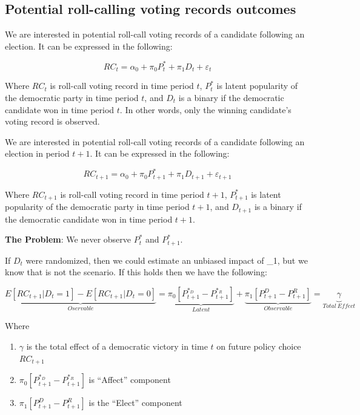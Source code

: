 \documentclass[
]{book}
\providecommand{\tightlist}{%
  \setlength{\itemsep}{0pt}\setlength{\parskip}{0pt}}
\begin{document}
\subsection{Potential roll-calling voting records outcomes}\label{potential-roll-calling-voting-records-outcomes}

We are interested in potential roll-call voting records of a candidate following an election. It can be expressed in the following:

\[ RC_t=\alpha_0 + \pi_0 P^\ast_t + \pi_1 D_t + \varepsilon_t \]

Where \(RC_t\) is roll-call voting record in time period \(t\), \(P^\ast_t\) is latent popularity of the democratic party in time period \(t\), and \(D_t\) is a binary if the democratic candidate won in time period \(t\). In other words, only the winning candidate's voting record is observed.

We are interested in potential roll-call voting records of a candidate following an election in period \(t+1\). It can be expressed in the following:

\[ RC_{t+1}=\alpha_0 + \pi_0 P^\ast_{t+1}+ \pi_1 D_{t+1} + \varepsilon_{t+1} \]

Where \(RC_{t+1}\) is roll-call voting record in time period \(t+1\), \(P^\ast_{t+1}\) is latent popularity of the democratic party in time period \(t+1\), and \(D_{t+1}\) is a binary if the democratic candidate won in time period \(t+1\).

\textbf{The Problem}: We never observe \(P^\ast_{t}\) and \(P^\ast_{t+1}\).

If \(D_t\) were randomized, then we could estimate an unbiased impact of \pi\_1, but we know that is not the scenario. If this holds then we have the following:

\[  \underbrace{E[RC_{t+1}|D_t=1]-E[RC_{t+1}|D_t=0]}_{Oservable} = \underbrace{\pi_0 [P^{\ast_D}_{t+1}-P^{\ast_R}_{t+1}]}_{Latent}+\underbrace{\pi_1 [P^D_{t+1}-P^R_{t+1}]}_{Observable} = \underbrace{\gamma}_{Total\ Effect} \]

Where

\begin{enumerate}
\def\labelenumi{\arabic{enumi}.}
\tightlist
\item
  \(\gamma\) is the total effect of a democratic victory in time \(t\) on future policy choice \(RC_{t+1}\)
\item
  \(\pi_0 [P^{\ast_D}_{t+1}-P^{\ast_R}_{t+1}]\) is ``Affect'' component
\item
  \(\pi_1 [P^D_{t+1}-P^R_{t+1}]\) is the ``Elect'' component
\end{enumerate}
\end{document}
